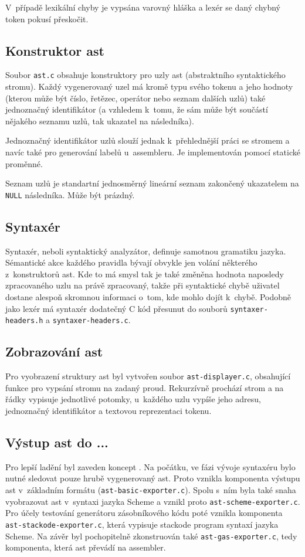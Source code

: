 \documentclass[a4paper,10pt]{article}
\begin{document}
V~případě lexikální chyby je vypsána varovný hláška a lexér se daný chybný token pokusí přeskočit.

\subsection{Konstruktor ast}
Soubor \verb|ast.c| obsahuje konstruktory pro uzly ast (abstraktního syntaktického stromu). Každý vygenerovaný uzel má kromě typu svého tokenu a jeho hodnoty (kterou může být číslo, řetězec, operátor nebo seznam dalších uzlů) také jednoznačný identifikátor (a vzhledem k~tomu, že sám může být součástí nějakého seznamu uzlů, tak ukazatel na následníka).

Jednoznačný identifikátor uzlů slouží jednak k~přehlednější práci se stromem a navíc také pro generování labelů u~assembleru. Je implementován pomocí statické proměnné.

Seznam uzlů je standartní jednosměrný lineární seznam zakončený ukazatelem na \verb|NULL| následníka. Může být prázdný.

\subsection{Syntaxér}
Syntaxér, neboli syntaktický analyzátor, definuje samotnou gramatiku jazyka. Sémantické akce každého pravidla bývají obvykle jen volání některého z~konstruktorů ast. Kde to má smysl tak je také změněna hodnota naposledy zpracovaného uzlu na právě zpracovaný, takže při syntaktické chybě uživatel dostane alespoň skromnou informaci o~tom, kde mohlo dojít k~chybě. Podobně jako lexér má syntaxér dodatečný C kód přesunut do souborů \verb|syntaxer-headers.h| a \verb|syntaxer-headers.c|.

\subsection{Zobrazování ast}
Pro vyobrazení struktury ast byl vytvořen soubor \verb|ast-displayer.c|, obsahující funkce pro vypsání stromu na zadaný proud. Rekurzívně prochází strom a na řádky vypisuje jednotlivé potomky, u~každého uzlu vypíše jeho adresu, jednoznačný identifikátor a textovou reprezentaci tokenu.

\subsection{Výstup ast do ...}
Pro lepší ladění byl zaveden koncept . Na počátku, ve fázi vývoje syntaxéru bylo nutné sledovat pouze hrubě vygenerovaný ast. Proto vznikla komponenta výstupu ast v~základním formátu (\verb|ast-basic-exporter.c|). Spolu s~ním byla také snaha vyobrazovat ast v~syntaxi jazyka Scheme a vznikl proto \verb|ast-scheme-exporter.c|. Pro účely testování generátoru zásobníkového kódu poté vznikla komponenta \verb|ast-stackode-exporter.c|, která vypisuje stackode program syntaxí jazyka Scheme. Na závěr byl pochopitelně zkonstruován také \verb|ast-gas-exporter.c|, tedy komponenta, která ast převádí na assembler. 
\end{document}
